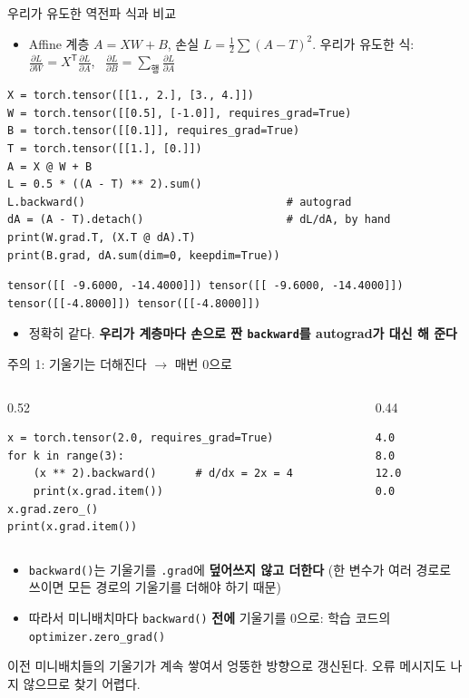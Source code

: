 \documentclass[aspectratio=169,11pt]{beamer}
\newcommand{\T}{^{\mathsf T}}
\newcommand{\pd}[2]{\frac{\partial #1}{\partial #2}}
\newcommand{\code}[1]{\texttt{#1}}
\begin{document}
\begin{frame}[fragile]{우리가 유도한 역전파 식과 비교}
\begin{itemize}
\item Affine 계층 $A=XW+B$, 손실 $L=\tfrac12\sum(A-T)^2$. 우리가 유도한 식: $\pd{L}{W}=X\T\pd{L}{A}$, \ $\pd{L}{B}=\sum_{\text{행}}\pd{L}{A}$
\end{itemize}
\begin{lstlisting}
X = torch.tensor([[1., 2.], [3., 4.]])
W = torch.tensor([[0.5], [-1.0]], requires_grad=True)
B = torch.tensor([[0.1]], requires_grad=True)
T = torch.tensor([[1.], [0.]])
A = X @ W + B
L = 0.5 * ((A - T) ** 2).sum()
L.backward()                               # autograd
dA = (A - T).detach()                      # dL/dA, by hand
print(W.grad.T, (X.T @ dA).T)
print(B.grad, dA.sum(dim=0, keepdim=True))
\end{lstlisting}
\begin{lstlisting}[style=outstyle]
tensor([[ -9.6000, -14.4000]]) tensor([[ -9.6000, -14.4000]])
tensor([[-4.8000]]) tensor([[-4.8000]])
\end{lstlisting}
\begin{itemize}
\item 정확히 같다. \textbf{우리가 계층마다 손으로 짠 \code{backward}를 autograd가 대신 해 준다}
\end{itemize}
\end{frame}

\begin{frame}[fragile]{주의 1: 기울기는 더해진다 $\to$ 매번 0으로}
\begin{columns}[T,onlytextwidth]
\begin{column}{0.52\textwidth}
\begin{lstlisting}
x = torch.tensor(2.0, requires_grad=True)
for k in range(3):
    (x ** 2).backward()      # d/dx = 2x = 4
    print(x.grad.item())
x.grad.zero_()
print(x.grad.item())
\end{lstlisting}
\end{column}
\begin{column}{0.44\textwidth}
\begin{lstlisting}[style=outstyle]
4.0
8.0
12.0
0.0
\end{lstlisting}
\end{column}
\end{columns}
\vskip2mm
\begin{itemize}
\item \code{backward()}는 기울기를 \code{.grad}에 \textbf{덮어쓰지 않고 더한다}
(한 변수가 여러 경로로 쓰이면 모든 경로의 기울기를 더해야 하기 때문)
\item 따라서 미니배치마다 \code{backward()} \textbf{전에} 기울기를 0으로: 학습 코드의 \code{optimizer.zero\_grad()}
\end{itemize}
\begin{thinkbox}[잊으면?]
이전 미니배치들의 기울기가 계속 쌓여서 엉뚱한 방향으로 갱신된다. 오류 메시지도 나지 않으므로 찾기 어렵다.
\end{thinkbox}
\end{frame}
\end{document}

